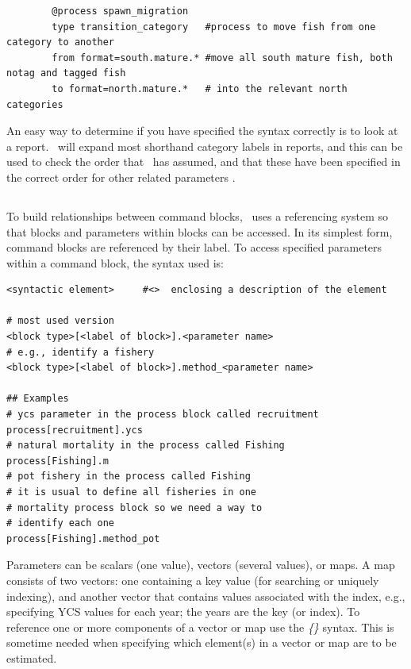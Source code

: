 {\small{\begin{verbatim}
		@process spawn_migration
		type transition_category   #process to move fish from one category to another
		from format=south.mature.* #move all south mature fish, both notag and tagged fish
		to format=north.mature.*   # into the relevant north categories
\end{verbatim}}}

An easy way to determine if you have specified the syntax correctly is to look at a report. \CNAME\ will expand most shorthand category labels in reports, and this can be used to check the order that \CNAME\ has assumed, and that these have been specified in the correct order for other related parameters . 

\subsection{\label{sec:params}}

To build relationships between command blocks, \CNAME\ uses  a referencing system so that blocks and parameters within blocks can be accessed. In its simplest form, command blocks are referenced by their label. To access specified parameters within a command block, the syntax used is:

{\small{\begin{verbatim}
<syntactic element>     #<>  enclosing a description of the element

# most used version
<block type>[<label of block>].<parameter name>
# e.g., identify a fishery
<block type>[<label of block>].method_<parameter name>

## Examples
# ycs parameter in the process block called recruitment
process[recruitment].ycs
# natural mortality in the process called Fishing
process[Fishing].m
# pot fishery in the process called Fishing
# it is usual to define all fisheries in one
# mortality process block so we need a way to
# identify each one
process[Fishing].method_pot
\end{verbatim}}}

Parameters can be scalars (one value), vectors (several values), or maps. A map consists of two vectors: one containing a key value (for searching or uniquely indexing), and another vector that contains values associated with the index, e.g., specifying YCS values for each year; the years are the key (or index). To reference one or more components of a vector or map use the \textit{\{\}} syntax. This is sometime needed when specifying which element(s) in a vector or map are to be estimated.

